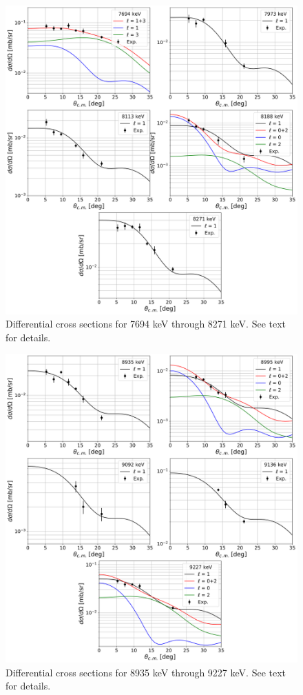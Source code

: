 \newpage

\begin{figure}[H]
\centering
\includegraphics[width=6.5in]{Chapter-6/figs/diffcross_6panel_3.png}
\caption{\label{fig:diffcross_6panel_3}Differential cross sections for 7694 keV through 8271 keV. See text for details.}
\end{figure}

\newpage

\begin{figure}[H]
\centering
\includegraphics[width=6.5in]{Chapter-6/figs/diffcross_6panel_4.png}
\caption{\label{fig:diffcross_6panel_4}Differential cross sections for 8935 keV through 9227 keV. See text for details.}
\end{figure}

